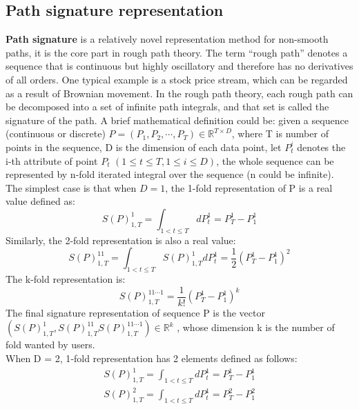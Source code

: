 \subsection{Path signature representation}
\textbf{Path signature} \cite{chen1958integration} is a relatively novel representation method for non-smooth paths, it is the core part in rough path theory. The term ``rough path'' denotes a sequence that is continuous but highly oscillatory and therefore has no derivatives of all orders. One typical example is a stock price stream, which can be regarded as a result of Brownian movement. In the rough path theory, each rough path can be decomposed into a set of infinite path integrals, and that set is called the signature of the path. A brief mathematical definition could be: given a sequence (continuous or discrete) $P = (P_1, P_2, \cdots, P_T) \in \mathbb{R}^{T \times D}$, where T is number of points in the sequence, D is the dimension of each data point, let $P_t^i$ denotes the i-th attribute of point $P_t$ $(1\le t\le T, 1 \le i \le D)$, the whole sequence can be represented by n-fold iterated integral over the sequence (n could be infinite). The simplest case is that when $D = 1$, the 1-fold representation of P is a real value defined as:
\begin{equation}
    S(P)_{1,T}^1 = \int_{1 < t \le T}dP_t^1 = P_T^1 - P_1^1
\end{equation}
Similarly, the 2-fold representation is also a real value:
\begin{equation}
    S(P)_{1,T}^{11} = \int_{1 < t \le T} S(P)_{1,T}^1dP_t^1 = \frac{1}{2} (P_T^1 - P_1^1)^2
\end{equation}
The k-fold representation is: 
\begin{equation}
    S(P)_{1,T}^{11\cdots 1} = \frac{1}{k!} (P_T^1 - P_1^1)^k
\end{equation}
The final signature representation of sequence P is the vector $(S(P)_{1,T}^1, S(P)_{1,T}^{11}S(P)_{1,T}^{11\cdots 1}) \in \mathbb{R}^k $ , whose dimension k is the number of fold wanted by users.\\
When D = 2, 1‐fold representation has 2 elements defined as follows:
\begin{equation}
    \begin{aligned}
        S(P)_{1,T}^1 = \int_{1 < t \le T}dP_t^1 = P_T^1 - P_1^1 \\
        S(P)_{1,T}^2 = \int_{1 < t \le T}dP_t^1 = P_T^2 - P_1^2
    \end{aligned}
\end{equation}
